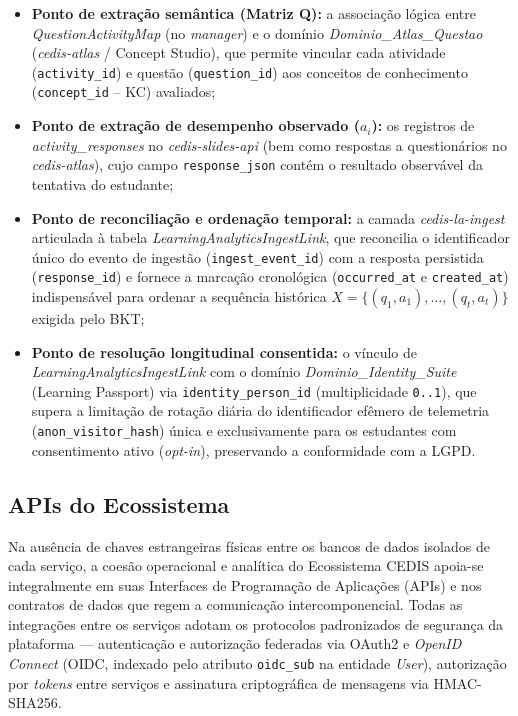 \begin{itemize}
    \item \textbf{Ponto de extração semântica (Matriz Q):} a associação lógica entre \textit{QuestionActivityMap} (no \textit{manager}) e o domínio \textit{Dominio\_Atlas\_Questao} (\textit{cedis-atlas} / Concept Studio), que permite vincular cada atividade (\texttt{activity\_id}) e questão (\texttt{question\_id}) aos conceitos de conhecimento (\texttt{concept\_id} -- KC) avaliados;
    \item \textbf{Ponto de extração de desempenho observado ($a_i$):} os registros de \textit{activity\_\allowbreak responses} no \textit{cedis-slides-api} (bem como respostas a questionários no \textit{cedis-atlas}), cujo campo \texttt{response\_json} contém o resultado observável da tentativa do estudante;
    \item \textbf{Ponto de reconciliação e ordenação temporal:} a camada \textit{cedis-la-ingest} articulada à tabela \textit{LearningAnalyticsIngestLink}, que reconcilia o identificador único do evento de ingestão (\texttt{ingest\_event\_id}) com a resposta persistida (\texttt{response\_id}) e fornece a marcação cronológica (\texttt{occurred\_at} e \texttt{created\_at}) indispensável para ordenar a sequência histórica $X = \{(q_1, a_1), \ldots, (q_t, a_t)\}$ exigida pelo BKT;
    \item \textbf{Ponto de resolução longitudinal consentida:} o vínculo de \textit{LearningAnalyticsIngestLink} com o domínio \textit{Dominio\_Identity\_Suite} (Learning Passport) via \texttt{identity\_person\_id} (multiplicidade \texttt{0..1}), que supera a limitação de rotação diária do identificador efêmero de telemetria (\texttt{anon\_visitor\_hash}) única e exclusivamente para os estudantes com consentimento ativo (\textit{opt-in}), preservando a conformidade com a LGPD.
\end{itemize}


\subsection{APIs do Ecossistema}
\label{subsec:apis-ecossistema}

Na ausência de chaves estrangeiras físicas entre os bancos de dados isolados de cada serviço, a coesão operacional e analítica do Ecossistema CEDIS apoia-se integralmente em suas Interfaces de Programação de Aplicações (APIs) e nos contratos de dados que regem a comunicação intercomponencial. Todas as integrações entre os serviços adotam os protocolos padronizados de segurança da plataforma — autenticação e autorização federadas via OAuth2 e \textit{OpenID Connect} (OIDC, indexado pelo atributo \texttt{oidc\_sub} na entidade \textit{User}), autorização por \textit{tokens} entre serviços e assinatura criptográfica de mensagens via HMAC-SHA256.

